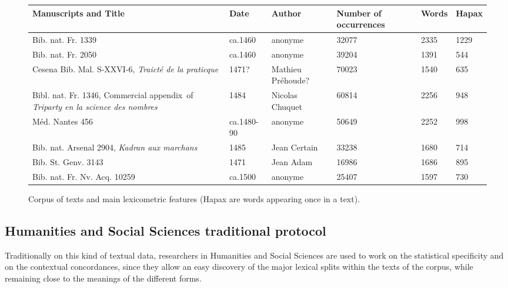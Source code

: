 \documentclass[preprint]{elsarticle}
\begin{document}
\begin{figure}
\begin{center}
\begin{small}
\setlength{\tabcolsep}{4pt}
\renewcommand{\arraystretch}{1.2}
\begin{tabular}{|p{4cm}|p{1.5cm}|p{1.5cm}|p{1.8cm}|p{1.3cm}|p{1.3cm}|}
\hline
\textbf{Manuscripts} and \textbf{Title} &   \textbf{Date} & \textbf{Author}  & \textbf{Number of} \textbf{occurrences} & \textbf{Words} & \textbf{Hapax} \\\hline\hline
Bib. nat. Fr. 1339 & ca.1460 & anonyme & 32077 & 2335 & 1229 \\
Bib. nat. Fr. 2050 & ca.1460 & anonyme & 39204 & 1391 & 544 \\
Cesena Bib. Mal. S-XXVI-6, \textit{Traict\'e de la praticque}  & 1471? & Mathieu {Pr\'ehoude}? & 70023 & 1540 & 635 \\
Bibl. nat. Fr. 1346, Commercial appendix~of \textit{Triparty en la science des nombres} & 1484		& Nicolas Chuquet & 60814 & 2256 & 948 \\ 
M\'ed. Nantes 456   & ca.1480-90		& anonyme & 50649 & 2252 & 998\\
Bib. nat. Arsenal 2904, \textit{Kadran aux marchans} & 1485 & Jean Certain & 33238 &1680 &714 \\ 
Bib. St. Genv. 3143 & 1471 & Jean Adam & 16986 & 1686 & 895\\
Bib. nat. Fr. Nv. Acq. 10259 & ca.1500 & anonyme & 25407 & 1597  &730 \\
\hline
\end{tabular}
\end{small}
\end{center}
\caption{Corpus of texts and main lexicometric features (Hapax are words appearing once in a text).}
\label{fig:chronomss}
\end{figure}
\subsection{Humanities and Social Sciences traditional protocol}

Traditionally on this kind of textual data, researchers in Humanities and Social Sciences are used to work on the statistical specificity and on the contextual concordances, since they allow an easy discovery of the major lexical splits within the texts of the corpus, while remaining close to the meanings of the different forms.\\
\end{document}
